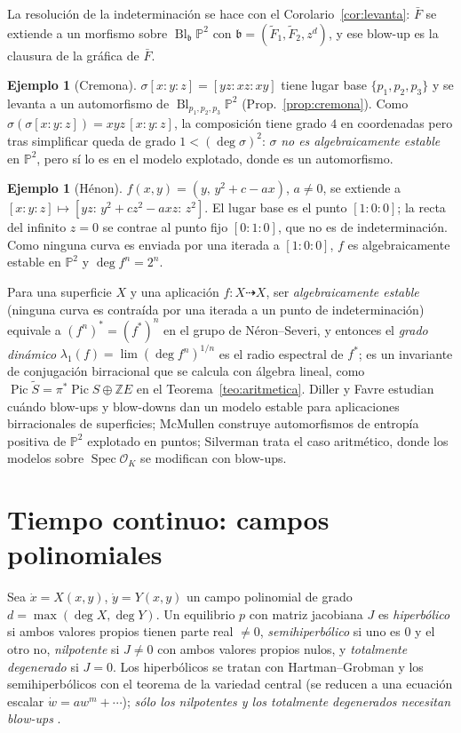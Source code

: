 \documentclass[11pt,a4paper,oneside]{book}
\newcommand{\Spec}{\operatorname{Spec}}
\newcommand{\Bl}{\operatorname{Bl}}
\newcommand{\Pic}{\operatorname{Pic}}
\newcommand{\PP}{\mathbb{P}}
\newcommand{\ZZ}{\mathbb{Z}}
\theoremstyle{plain}
\theoremstyle{definition}
\newtheorem{ejemplo}[teorema]{Ejemplo}
\theoremstyle{remark}
\begin{document}
La resolución de la indeterminación se hace con el Corolario~\ref{cor:levanta}: $\bar F$ se extiende a un morfismo sobre $\Bl_{\mathfrak b}\PP^2$ con $\mathfrak b=(\tilde F_1,\tilde F_2,z^d)$, y ese blow-up es la clausura de la gráfica de $\bar F$.

\begin{ejemplo}[Cremona]\label{ej:cremona}
$\sigma[x:y:z]=[yz:xz:xy]$ tiene lugar base $\{p_1,p_2,p_3\}$ y se levanta a un automorfismo de $\Bl_{p_1,p_2,p_3}\PP^2$ (Prop.~\ref{prop:cremona}). Como $\sigma(\sigma[x:y:z])=xyz\,[x:y:z]$, la composición tiene grado $4$ en coordenadas pero tras simplificar queda de grado $1<(\deg\sigma)^2$: $\sigma$ \emph{no es algebraicamente estable} en $\PP^2$, pero sí lo es en el modelo explotado, donde es un automorfismo.
\end{ejemplo}

\begin{ejemplo}[Hénon]\label{ej:henon}
$f(x,y)=(y,\,y^2+c-ax)$, $a\neq0$, se extiende a $[x:y:z]\mapsto[yz:\,y^2+cz^2-axz:\,z^2]$. El lugar base es el punto $[1:0:0]$; la recta del infinito $z=0$ se contrae al punto fijo $[0:1:0]$, que no es de indeterminación. Como ninguna curva es enviada por una iterada a $[1:0:0]$, $f$ es algebraicamente estable en $\PP^2$ y $\deg f^n=2^n$.
\end{ejemplo}

Para una superficie $X$ y una aplicación $f\colon X\dashrightarrow X$, ser \emph{algebraicamente estable} (ninguna curva es contraída por una iterada a un punto de indeterminación) equivale a $(f^n)^*=(f^*)^n$ en el grupo de Néron--Severi, y entonces el \emph{grado dinámico} $\lambda_1(f)=\lim(\deg f^n)^{1/n}$ es el radio espectral de $f^*$; es un invariante de conjugación birracional que se calcula con álgebra lineal, como $\Pic\tilde S=\pi^*\Pic S\oplus\ZZ E$ en el Teorema~\ref{teo:aritmetica}. Diller y Favre \cite{DF} estudian cuándo blow-ups y blow-downs dan un modelo estable para aplicaciones birracionales de superficies; McMullen \cite{McM} construye automorfismos de entropía positiva de $\PP^2$ explotado en puntos; Silverman \cite{Sil} trata el caso aritmético, donde los modelos sobre $\Spec\mathcal O_K$ se modifican con blow-ups.

\section{Tiempo continuo: campos polinomiales}

Sea $\dot x=X(x,y)$, $\dot y=Y(x,y)$ un campo polinomial de grado $d=\max(\deg X,\deg Y)$. Un equilibrio $p$ con matriz jacobiana $J$ es \emph{hiperbólico} si ambos valores propios tienen parte real $\ne0$, \emph{semihiperbólico} si uno es $0$ y el otro no, \emph{nilpotente} si $J\neq0$ con ambos valores propios nulos, y \emph{totalmente degenerado} si $J=0$. Los hiperbólicos se tratan con Hartman--Grobman y los semihiperbólicos con el teorema de la variedad central (se reducen a una ecuación escalar $\dot w=aw^m+\cdots$); \emph{sólo los nilpotentes y los totalmente degenerados necesitan blow-ups} \cite{DLA}.
\end{document}
